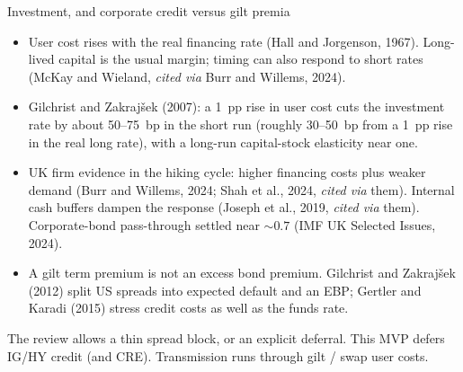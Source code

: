 \documentclass[11pt,aspectratio=169]{beamer}
\begin{document}
\begin{frame}{Investment, and corporate credit versus gilt premia}
  \begin{itemize}
    \item User cost rises with the real financing rate
          (Hall and Jorgenson, 1967). Long-lived capital is the usual
          margin; timing can also respond to short rates
          (McKay and Wieland, \emph{cited via} Burr and Willems, 2024).
    \item Gilchrist and Zakraj\v{s}ek (2007): a 1~pp rise in user cost
          cuts the investment rate by about 50--75~bp in the short run
          (roughly 30--50~bp from a 1~pp rise in the real long rate),
          with a long-run capital-stock elasticity near one.
    \item UK firm evidence in the hiking cycle: higher financing costs
          plus weaker demand (Burr and Willems, 2024; Shah et al., 2024,
          \emph{cited via} them). Internal cash buffers dampen the
          response (Joseph et al., 2019, \emph{cited via} them).
          Corporate-bond pass-through settled near $\sim 0.7$
          (IMF UK Selected Issues, 2024).
    \item A gilt term premium is not an excess bond premium.
          Gilchrist and Zakraj\v{s}ek (2012) split US spreads into
          expected default and an EBP; Gertler and Karadi (2015)
          stress credit costs as well as the funds rate.
  \end{itemize}
  \vspace{0.2em}
  {\scriptsize The review allows a thin spread block, or an explicit
  deferral. This MVP defers IG/HY credit (and CRE). Transmission runs
  through gilt / swap user costs.}
\end{frame}
\end{document}
